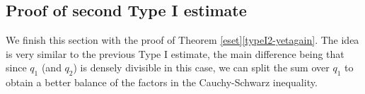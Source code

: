 \documentclass[12pt,a4paper,reqno]{amsart}
\numberwithin{equation}{section}
\theoremstyle{plain}
\theoremstyle{definition}
\newcommand\eps{\varepsilon}
\renewcommand{\lessapprox}{\llcurly}
\begin{document}

\subsection{Proof of second Type I estimate}\label{second-typei}

We finish this section with the proof of Theorem
\ref{eset}\eqref{typeI2-yetagain}.  The idea is very similar to the
previous Type I estimate, the main difference being that since $q_1$
(and $q_2$) is densely divisible in this case, we can split the sum
over $q_1$ to obtain a better balance of the factors in the
Cauchy-Schwarz inequality. 
\end{document}
